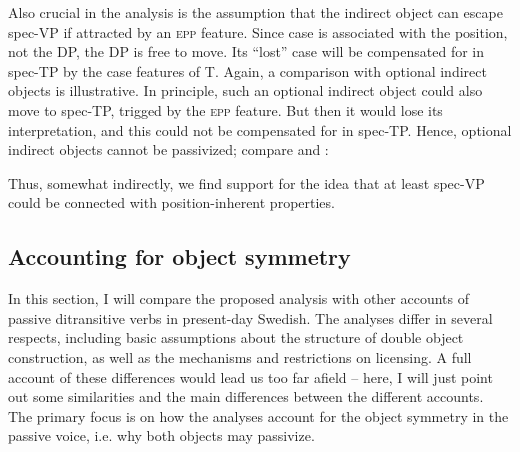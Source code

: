\documentclass[output=paper]{langscibook}
\begin{document}
Also crucial in the analysis is the assumption that the indirect object can escape spec-VP if attracted by an \textsc{epp} feature. Since case is associated with the position, not the DP, the DP is free to move. Its “lost” case will be compensated for in spec-TP by the case features of T. Again, a comparison with optional indirect objects is illustrative. In principle, such an optional indirect object could also move to spec-TP, trigged by the \textsc{epp} feature. But then it would lose its interpretation, and this could not be compensated for in spec-TP. Hence, optional indirect objects cannot be passivized; compare  and :


\ea%
    \label{ex:falk:23}

\z
\z

Thus, somewhat indirectly, we find support for the idea that at least spec-VP could be connected with position-inherent properties.

\subsection{Accounting for object symmetry}\label{sec:falk:4.5}


In this section, I will compare the proposed analysis with other accounts of passive ditransitive verbs in present-day Swedish. The analyses differ in several respects, including basic assumptions about the structure of double object construction, as well as the mechanisms and restrictions on licensing. A full account of these differences would lead us too far afield – here, I will just point out some similarities and the main differences between the different accounts. The primary focus is on how the analyses account for the object symmetry in the passive voice, i.e. why both objects may passivize.
\end{document}
